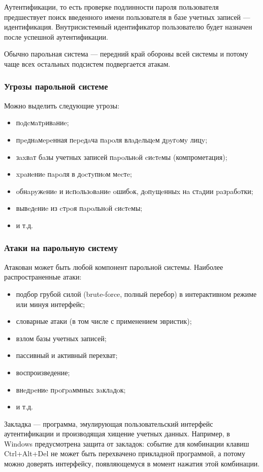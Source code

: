 Аутентификации, то есть проверке подлинности пароля пользователя предшествует поиск введенного имени пользователя в базе учетных записей --- идентификация. Внутрисистемный идентификатор пользователю будет назначен после успешной аутентификации.


Обычно парольная система — передний край обороны всей системы и потому чаще всех остальных подсистем подвергается атакам.

\begin{frame}
\frametitle{Угрозы парольной системе}
Можно выделить следующие угрозы:
\begin{itemize}
    \item пoдcмaтpивaниe;
    \item пpeднaмepeнная пepeдaча пapoля влaдeльцeм дpyгoмy лицy;
    \item зaxвaт бaзы учетных записей пapoльнoй cиcтeмы (компрометация);
    \item xpaнeниe пapoля в дocтyпнoм мecтe;
    \item oбнapyжeниe и иcпoльзoвaниe oшибoк, дoпyщeнныx нa стaдии paзpaбoтки;
    \item вывeдeниe из cтpoя пapoльнoй cиcтeмы;
    \item и т.д.
\end{itemize}
\end{frame}


\begin{frame}
\frametitle{Атаки на парольную систему}
Атакован может быть любой компонент парольной системы. Наиболее распространенные атаки:
\begin{itemize}
    \item подбор грубой силой (brute-force, полный перебор) в интерактивном режиме или минуя интерфейс;
    \item словарные атаки (в том числе с применением эвристик);
    \item взлом базы учетных записей;
    \item пассивный и активный перехват;
    \item воспроизведение;
    \item внeдpeниe пpoгpaммныx зaклaдoк;
    \item и т.д.
\end{itemize}
\end{frame}


Закладка --- программа, эмулирующая пользовательский интерфейс аутентификации и производящая хищение учетных данных. Например, в Windows предусмотрена защита от закладок: событие для комбинации клавиш Ctrl+Alt+Del не может быть перехвачено прикладной программой, а потому можно доверять интерфейсу, появляющемуся в момент нажатия этой комбинации.


